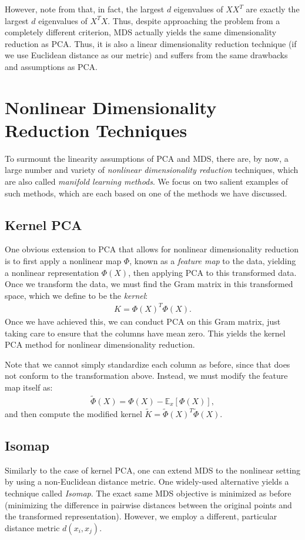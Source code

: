 \documentclass[12pt,letterpaper]{article}
\providecommand{\Ep}[2]{\mathbb{E}_#1\left[ #2 \right]}
\begin{document}
However, note from   that, in fact, the largest $d$ eigenvalues of  $XX^T$ are exactly the largest $d$ eigenvalues of $X^T X$. Thus, despite approaching the problem from a completely different criterion, MDS actually yields the same dimensionality reduction as PCA. Thus, it is also a linear dimensionality reduction technique (if we use Euclidean distance as our metric) and suffers from the same drawbacks and assumptions as PCA.
 
 
\section{Nonlinear Dimensionality Reduction Techniques}
\label{sec:NL}

To surmount the linearity assumptions of PCA and MDS, there are, by now, a large number and variety of  \emph{nonlinear dimensionality reduction} techniques, which are also called \emph{manifold learning methods}. We focus on two salient examples of such methods, which are each based on one of the methods we have discussed.

\subsection{Kernel PCA}
One obvious extension to PCA that allows for nonlinear dimensionality reduction is to first apply a nonlinear map $\Phi$, known as a \emph{feature map} to the data, yielding a nonlinear representation $\Phi(X)$, then applying PCA to this transformed data.  Once we transform the data, we must find the Gram matrix in this transformed space, which we define to be the \emph{kernel}:
\begin{align}
K = \Phi(X)^T \Phi(X).
\end{align}
Once we have achieved this, we can conduct PCA on this Gram matrix, just taking care to ensure that the columns have mean zero. This yields the kernel PCA method for nonlinear dimensionality reduction.

Note that we cannot simply standardize each column as before, since that does not conform to the transformation above. Instead, we must modify the feature map itself as:
\begin{align}
\tilde{\Phi}(X) = \Phi(X) - \Ep{x}{\Phi(X)},
\end{align}
and then compute the modified kernel $\tilde{K} = \tilde{\Phi}(X)^T \tilde{\Phi}(X)$.


\subsection{Isomap}
Similarly to the case of kernel PCA, one can extend MDS to the nonlinear setting by using a non-Euclidean distance metric. One widely-used alternative yields a technique called \emph{Isomap}. The exact same MDS objective is minimized as before (minimizing the difference in pairwise distances between the original points and the transformed representation). However, we employ a different, particular distance metric $d(x_i , x_j)$.
\end{document}
